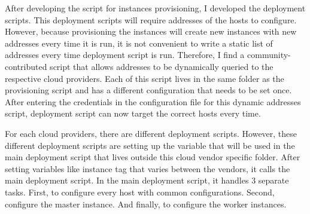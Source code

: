 After developing the script for instances provisioning, I developed the deployment scripts. This deployment scripts will require addresses of the hosts to configure. However, because provisioning the instances will create new instances with new addresses every time it is run, it is not convenient to write a static list of addresses every time deployment script is run. Therefore, I find a community-contributed script that allows addresses to be dynamically queried to the respective cloud providers. Each of this script lives in the same folder as the provisioning script and has a different configuration that needs to be set once. After entering the credentials in the configuration file for this dynamic addresses script, deployment script can now target the correct hosts every time.

For each cloud providers, there are different deployment scripts. However, these different deployment scripts are setting up the variable that will be used in the main deployment script that lives outside this cloud vendor specific folder. After setting variables like instance tag that varies between the vendors, it calls the main deployment script. In the main deployment script, it handles 3 separate tasks. First, to configure every host with common configurations. Second, configure the master instance. And finally, to configure the worker instances.

